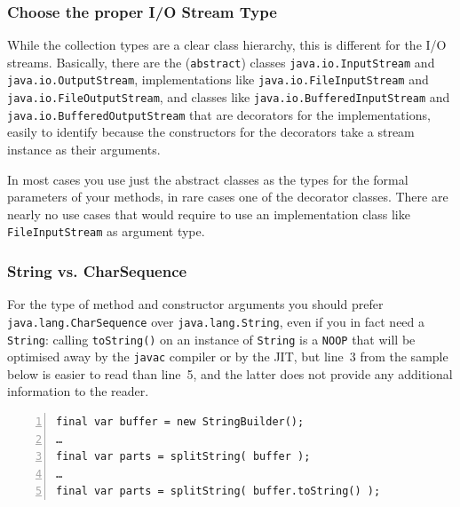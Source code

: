 \documentclass[11pt,a4paper, titlepage, parskip=half, headsepline, footsepline, cleardoublepage=current, headheight=1cm]{scrbook}
\begin{document}

\subsubsection{Choose the proper I/O Stream Type}\label{sec:ChooseTheProperIOStreamType}
While the collection types are a clear class hierarchy, this is different for the I/O streams. Basically, there are the (\lstinline|abstract|) classes \lstinline|java.io.InputStream|\autocite{ORACLE_DOC_INPUTSTREAM_CLASS} and \lstinline|java.io.OutputStream|\autocite{ORACLE_DOC_OUTPUTSTREAM_CLASS}, implementations like \lstinline|java.io.FileInputStream|\autocite{ORACLE_DOC_FILEINPUTSTREAM_CLASS} and \lstinline|java.io.FileOutputStream|\autocite{ORACLE_DOC_FILEOUTPUTSTREAM_CLASS}, and classes like \lstinline|java.io.BufferedInputStream|\autocite{ORACLE_DOC_BUFFEREDINPUTSTREAM_CLASS} and \lstinline|java.io.BufferedOutputStream|\autocite{ORACLE_DOC_BUFFEREDOUTPUTSTREAM_CLASS} that are decorators for the implementations, easily to identify because the constructors for the decorators take a stream instance as their arguments.

In most cases you use just the abstract classes as the types for the formal parameters of your methods, in rare cases one of the decorator classes. There are nearly no use cases that would require to use an implementation class like \lstinline|FileInputStream| as argument type.

\subsubsection{String vs. CharSequence}
For the type of method and constructor arguments you should prefer \lstinline|java.lang.CharSequence|\autocite{ORACLE_DOC_CHARSEQUENCE_INTERFACE} over \lstinline|java.lang.String|\autocite{ORACLE_DOC_STRING_CLASS}, even if you in fact need a \lstinline|String|: calling \lstinline|toString()| on an instance of \lstinline|String| is a \verb#NOOP# that will be optimised away by the \verb#javac# compiler or by the JIT, but line~3 from the sample below is easier to read than line~5, and the latter does not provide any additional information to the reader.
\begin{lstlisting}[numbers=left]
final var buffer = new StringBuilder();
…
final var parts = splitString( buffer );
…
final var parts = splitString( buffer.toString() );
\end{lstlisting}
\end{document}
